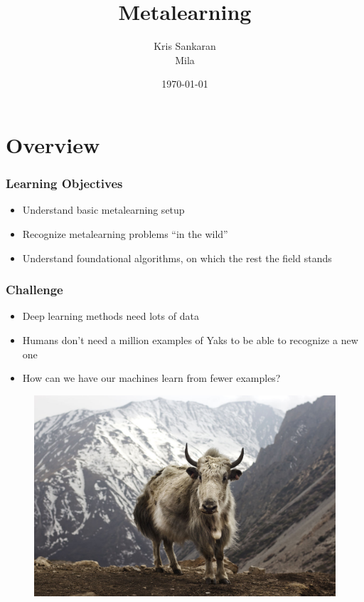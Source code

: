 \documentclass[10pt,mathserif]{beamer}
\title{\large \bfseries Metalearning}
\author{Kris Sankaran\\[3ex]
Mila}
\date{\today}
\begin{document}
\frame{
  \thispagestyle{empty}
  \titlepage
}

\section{Overview}
\begin{frame}
\frametitle{Learning Objectives}
\begin{itemize}\itemsep=12pt
\item Understand basic metalearning setup
\item Recognize metalearning problems ``in the wild''
\item Understand foundational algorithms, on which the rest the
  field stands
\end{itemize}
\end{frame}

\begin{frame}
  \frametitle{Challenge}
  \begin{itemize}\itemsep=12pt
  \item Deep learning methods need lots of data
  \item Humans don't need a million examples of Yaks to be able to recognize
    a new one
  \item How can we have our machines learn from fewer examples?
  \end{itemize}
  \begin{figure}
    \includegraphics[width=0.4\paperwidth]{figure/yak}
  \end{figure}
\end{frame}
\end{document}
